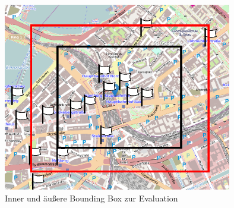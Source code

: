 \begin{figure}[H]
\begin{center}
\includegraphics[width=100mm]{images/ch6_img04_bbox.png}
\caption{Inner und äußere Bounding Box zur Evaluation}
\label{img:ch6_img04_bbox}
\end{center}
\end{figure}

